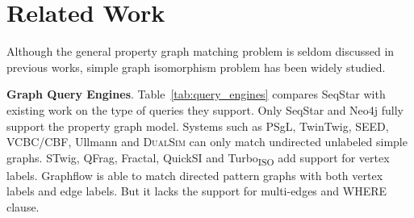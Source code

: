 \section{Related Work}
Although the general property graph matching problem is seldom discussed in previous works,
simple graph isomorphism problem has been widely studied.

\textbf{Graph Query Engines}.
Table~\ref{tab:query_engines} compares SeqStar with existing work on the type of queries they support.
Only SeqStar and Neo4j fully support the property graph model.
Systems such as PSgL\cite{DBLP:conf/sigmod/ShaoCCMYX14}, TwinTwig\cite{DBLP:journals/pvldb/LaiQLC15},
SEED\cite{DBLP:journals/pvldb/LaiQLZC16}, VCBC/CBF\cite{DBLP:journals/pvldb/QiaoZC17},
Ullmann\cite{DBLP:journals/jacm/Ullmann76} and \textsc{DualSim}\cite{DBLP:conf/sigmod/KimLBHLKJ16} can only match undirected unlabeled simple graphs.
STwig\cite{DBLP:journals/pvldb/SunWWSL12}, QFrag\cite{DBLP:conf/cloud/SerafiniMS17},
Fractal\cite{DBLP:conf/sigmod/DiasTGM019}, QuickSI\cite{DBLP:journals/pvldb/ShangZLY08} and Turbo\textsubscript{ISO}\cite{DBLP:conf/sigmod/HanLL13} add support for vertex labels.
Graphflow is able to match directed pattern graphs with both vertex labels and edge labels. But it lacks the support for multi-edges and WHERE clause.

